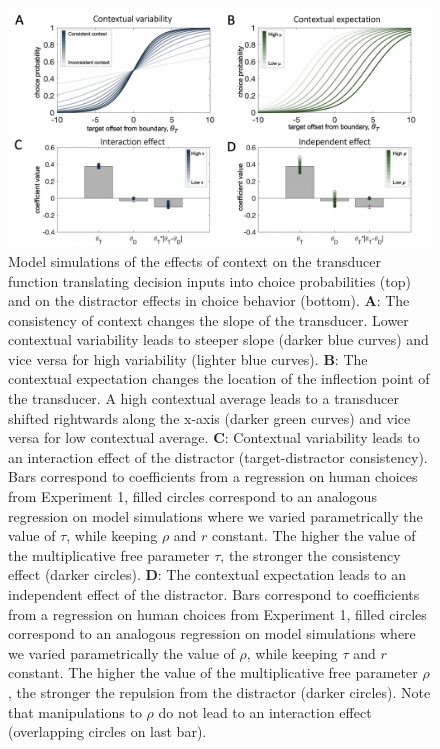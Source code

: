 \documentclass[a4paper, nobind]{templates/ociamthesis}
\begin{document}
\begin{figure}

{\centering \includegraphics[width=1\linewidth]{figures/distr-model} 

}

\caption[Computational model, Simulations]{Model simulations of the effects of context on the transducer function translating decision inputs into choice probabilities (top) and on the distractor effects in choice behavior (bottom). $\textbf{A:}$ The consistency of context changes the slope of the transducer. Lower contextual variability leads to steeper slope (darker blue curves) and vice versa for high variability (lighter blue curves). $\textbf{B:}$ The contextual expectation changes the location of the inflection point of the transducer. A high contextual average leads to a transducer shifted rightwards along the x-axis (darker green curves) and vice versa for low contextual average. $\textbf{C:}$ Contextual variability leads to an interaction effect of the distractor (target-distractor consistency). Bars correspond to coefficients from a regression on human choices from Experiment 1, filled circles correspond to an analogous regression on model simulations where we varied parametrically the value of $\tau$, while keeping $\rho$ and $r$ constant. The higher the value of the multiplicative free parameter $\tau$, the stronger the consistency effect (darker circles). $\textbf{D:}$ The contextual expectation leads to an independent effect of the distractor. Bars correspond to coefficients from a regression on human choices from Experiment 1, filled circles correspond to an analogous regression on model simulations where we varied parametrically the value of $\rho$, while keeping $\tau$ and $r$ constant. The higher the value of the multiplicative free parameter $\rho$, the stronger the repulsion from the distractor (darker circles). Note that manipulations to $\rho$ do not lead to an interaction effect (overlapping circles on last bar).}\label{fig:distr-model}
\end{figure}
\end{document}
